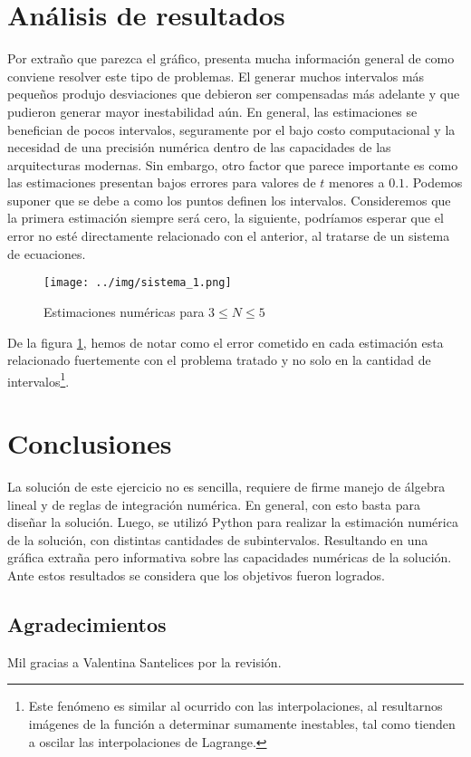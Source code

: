 \documentclass[../portafolio.tex]{subfiles}
\begin{document}
\section{Análisis de resultados}
Por extraño que parezca el gráfico, presenta mucha información general de como conviene resolver este tipo de problemas. El generar muchos intervalos más pequeños produjo desviaciones que debieron ser compensadas más adelante y que pudieron generar mayor inestabilidad aún. En general, las estimaciones se benefician de pocos intervalos, seguramente por el bajo costo computacional y la necesidad de una precisión numérica dentro de las capacidades de las arquitecturas modernas. Sin embargo, otro factor que parece importante es como las estimaciones presentan bajos errores para valores de $t$ menores a $0.1$. Podemos suponer que se debe a como los puntos definen los intervalos. Consideremos que la primera estimación siempre será cero, la siguiente, podríamos esperar que el error no esté directamente relacionado con el anterior, al tratarse de un sistema de ecuaciones. 
\begin{figure}
\centering
\texttt{[image: ../img/sistema\_1.png]}
\caption{Estimaciones numéricas para $3\leq N \leq 5$}\label{g3_ej12:graf1}
\end{figure}
De la figura \ref{g3_ej12:graf1}, hemos de notar como el error cometido en cada estimación esta relacionado fuertemente con  el problema tratado y no solo en la cantidad de intervalos\footnote{Este fenómeno es similar al ocurrido con las interpolaciones, al resultarnos imágenes de la función a determinar sumamente inestables, tal como tienden a oscilar las interpolaciones de Lagrange.}.
\section*{Conclusiones}
La solución de este ejercicio no es sencilla, requiere de firme manejo de álgebra lineal y de reglas de integración numérica. En general, con esto basta para diseñar la solución. Luego, se utilizó Python para realizar la estimación numérica de la solución, con distintas cantidades de subintervalos. Resultando en una gráfica extraña pero informativa sobre las capacidades numéricas de la solución. Ante estos resultados se considera que los objetivos fueron logrados.
\subsection*{Agradecimientos}

Mil gracias a Valentina Santelices por la revisión.
\end{document}
